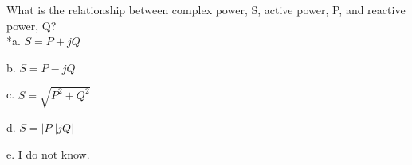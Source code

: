 
What is the relationship between complex power, S, active power, P, and reactive power, Q?\\

*a. $S = P + jQ$

b. $S = P - jQ$

c. $S = \sqrt{P^2+Q^2}$

d. $S = |P||jQ|$

e. I do not know.\\
